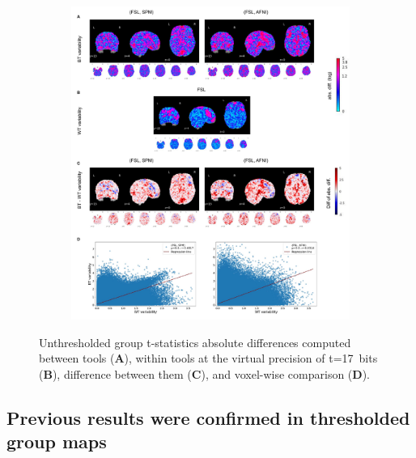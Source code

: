 \documentclass[11pt,onecolumn]{article}
\begin{document}
\begin{figure}[ht]
  \begin{subfigure}[ht]{\textwidth}
    \centering
    \includegraphics[width=.75\textwidth]{figures/bg_global_precision.pdf}
  \end{subfigure}
  \caption{Unthresholded group t-statistics absolute differences computed between tools (\textbf{A}),
    within tools at the virtual precision of t=17~bits (\textbf{B}), difference between them (\textbf{C}), and
    voxel-wise comparison (\textbf{D}).}
  \label{fig:gnp-mni}
\end{figure}


\subsection{Previous results were confirmed in thresholded group maps}
\end{document}
